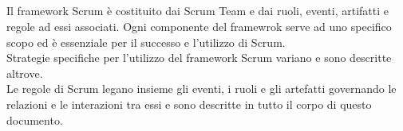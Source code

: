 \subsection*{\color{SteelBlue}{Scrum Framework}}%
\label{sec:framework}
Il framework Scrum \`e costituito dai Scrum Team e dai ruoli, eventi, artifatti e regole ad essi associati. Ogni componente del framewrok 
serve ad uno specifico scopo ed \`e essenziale per il successo e l'utilizzo di Scrum.
\newline
\\Strategie specifiche per l'utilizzo del framework Scrum variano e sono descritte altrove.
\newline
\\ Le regole di Scrum legano insieme gli eventi, i ruoli e gli artefatti governando le relazioni e le interazioni tra essi e sono descritte 
in tutto il corpo di questo documento.

